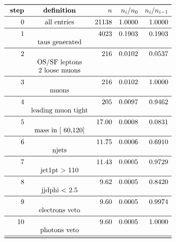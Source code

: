 \documentclass[11pt,a4paper]{article}
\begin{document}
\begin{table}
\caption{\emph{Entries after each selection step, normalised to 5.00 $fb^{-1}$; n is the number of entries after the i-th selection step; Note that cuts on second jet are applied only if a second jet exists with $p_t$ > 30\,GeV.}}
\[
\begin{array}{rcrrr}
\toprule
\ \textbf{step}& \textbf{definition}  & n  &  n_i/n_0 & n_i/n_{i-1}  \\ 
\midrule
 0  & \text{all entries} &  21138 & 1.0000 & 1.0000 \\
\midrule
 1  & &   4023 & 0.1903 & 0.1903 \\
& \text{taus generated} & & & \\
\midrule
 2  & &    216 & 0.0102 & 0.0537 \\
& \text{OS/SF leptons} & & & \\
& \text{2 loose muons} & & & \\
\midrule
 3  & &    216 & 0.0102 & 1.0000 \\
& \text{muons} & & & \\
\midrule
 4  & &    205 & 0.0097 & 0.9462 \\
& \text{leading muon tight} & & & \\
\midrule
 5  & &  17.00 & 0.0008 & 0.0831 \\
& \text{mass in [ 60,120]} & & & \\
\midrule
 6  & &  11.75 & 0.0006 & 0.6910 \\
& \text{njets} & & & \\
\midrule
 7  & &  11.43 & 0.0005 & 0.9729 \\
& \text{jet1pt >  110} & & & \\
\midrule
 8  & &   9.62 & 0.0005 & 0.8420 \\
& \text{jjdphi < 2.5} & & & \\
\midrule
 9  & &   9.60 & 0.0005 & 0.9974 \\
& \text{electrons veto} & & & \\
\midrule
 10  & &   9.60 & 0.0005 & 1.0000 \\
& \text{photons veto} & & & \\
\midrule
\bottomrule
\end{array}
\]
\end{table}
\end{document}
